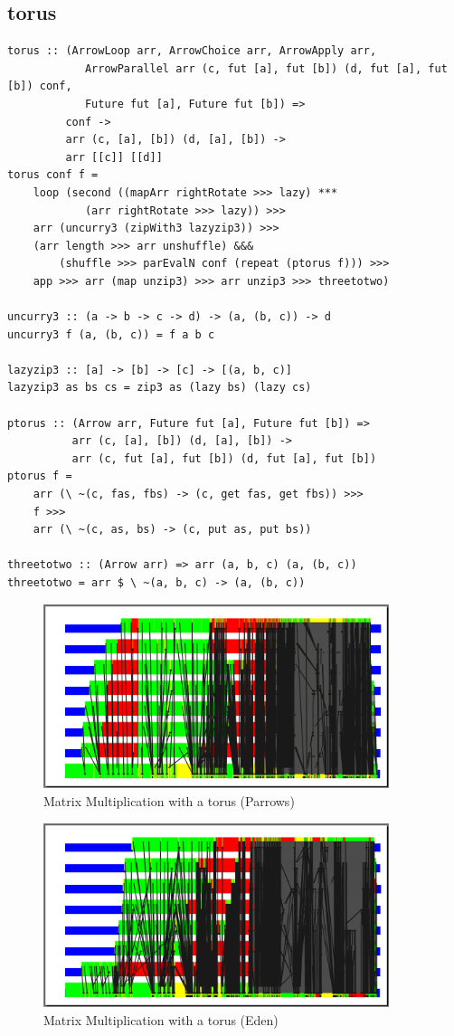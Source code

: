 \subsection{torus}

\begin{lstlisting}[frame=htrbl]
torus :: (ArrowLoop arr, ArrowChoice arr, ArrowApply arr,
            ArrowParallel arr (c, fut [a], fut [b]) (d, fut [a], fut [b]) conf,
            Future fut [a], Future fut [b]) =>
         conf ->
         arr (c, [a], [b]) (d, [a], [b]) ->
         arr [[c]] [[d]]
torus conf f =
	loop (second ((mapArr rightRotate >>> lazy) ***
			(arr rightRotate >>> lazy)) >>>
    arr (uncurry3 (zipWith3 lazyzip3)) >>>
    (arr length >>> arr unshuffle) &&&
        (shuffle >>> parEvalN conf (repeat (ptorus f))) >>>
    app >>> arr (map unzip3) >>> arr unzip3 >>> threetotwo)

uncurry3 :: (a -> b -> c -> d) -> (a, (b, c)) -> d
uncurry3 f (a, (b, c)) = f a b c

lazyzip3 :: [a] -> [b] -> [c] -> [(a, b, c)]
lazyzip3 as bs cs = zip3 as (lazy bs) (lazy cs)

ptorus :: (Arrow arr, Future fut [a], Future fut [b]) =>
          arr (c, [a], [b]) (d, [a], [b]) ->
          arr (c, fut [a], fut [b]) (d, fut [a], fut [b])
ptorus f =
	arr (\ ~(c, fas, fbs) -> (c, get fas, get fbs)) >>>
	f >>>
	arr (\ ~(c, as, bs) -> (c, put as, put bs))

threetotwo :: (Arrow arr) => arr (a, b, c) (a, (b, c))
threetotwo = arr $ \ ~(a, b, c) -> (a, (b, c))
\end{lstlisting}

\begin{figure}[ht]
	\centering
	\includegraphics[width=0.9\textwidth]{images/torus_matrix_parrows}
	\caption[without Futures]{Matrix Multiplication with a torus (Parrows)}
\end{figure}

\begin{figure}[ht]
	\centering
	\includegraphics[width=0.9\textwidth]{images/torus_matrix_eden}
	\caption[with Futures]{Matrix Multiplication with a torus (Eden)}
\end{figure}
